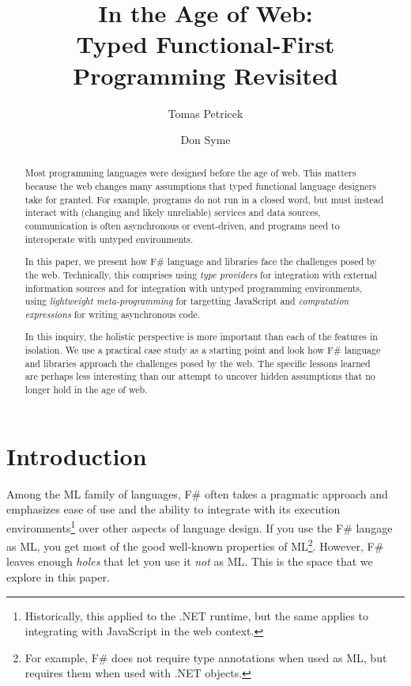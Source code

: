 \documentclass[submission,copyright,creativecommons]{eptcs}
\title{In the Age of Web:\\
  \textnormal{\LARGE Typed Functional-First Programming Revisited}}
\author{Tomas Petricek
\institute{University of Cambridge, UK}
\email{tomas@tomasp.net}
\and
Don Syme
\institute{Microsoft Research Cambridge, UK}
\email{don.syme@microsoft.com}
}
\begin{document}
\maketitle


\begin{abstract}
Most programming languages were designed before the age of web.
This matters because the web changes many assumptions that typed functional language designers take 
for granted. For example, programs do not run in a closed word, but must instead interact with 
(changing and likely unreliable) services and data sources, communication is often asynchronous 
or event-driven, and programs need to interoperate with untyped environments.

In this paper, we present how F\# language and libraries face the challenges posed by the web.
Technically, this comprises using \emph{type providers} for integration with external information 
sources and for integration with untyped programming environments, using \emph{lightweight 
meta-programming} for targetting JavaScript and \emph{computation expressions} for writing 
asynchronous code.

In this inquiry, the holistic perspective is more important than each of the features in isolation.
We use a practical case study as a starting point and look how F\# language and libraries approach 
the challenges posed by the web. The specific lessons learned are perhaps less interesting than 
our attempt to uncover hidden assumptions that no longer hold in the age of web.
\end{abstract}


\section{Introduction}

Among the ML family of languages, F\# often takes a pragmatic approach and emphasizes ease of use
and the ability to integrate with its execution environments\footnote{Historically, this applied 
to the .NET runtime, but the same applies to integrating with JavaScript in the web context.} over 
other aspects of language design. If you use the F\# langage as ML, you get most of the good 
well-known properties of ML\footnote{For example, F\# does not require type annotations when used 
as ML, but requires them when used with .NET objects.}. However, F\# leaves enough \emph{holes} that
let you use it \emph{not} as ML. This is the space that we explore in this paper.
\end{document}
